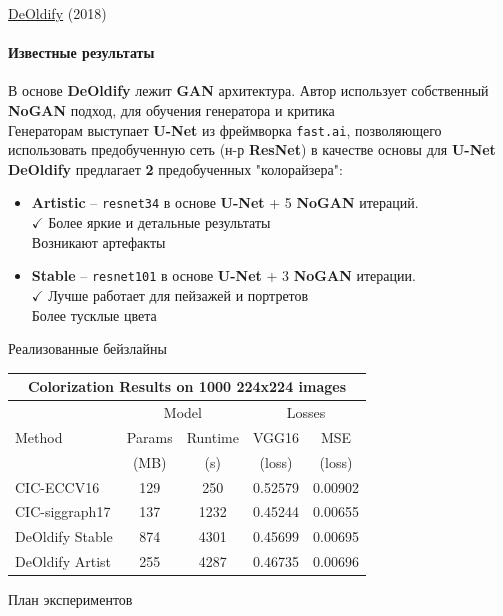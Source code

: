 \documentclass[aspectratio=169]{beamer}
\begin{document}
\begin{frame}{\href{https://github.com/jantic/DeOldify}{DeOldify} (2018)}
    \framesubtitle{Известные результаты}

    В основе \textbf{DeOldify} лежит \textbf{GAN} архитектура. Автор использует собственный \textbf{NoGAN} подход, для обучения генератора и критика\\[3mm]
    
    Генераторам выступает \textbf{U-Net} из фреймворка \texttt{fast.ai}, позволяющего использовать предобученную сеть (н-р \textbf{ResNet}) в качестве основы для \textbf{U-Net}\\[3mm]

    \textbf{DeOldify} предлагает \textbf{2} предобученных "колорайзера":\\[3mm]
    \begin{itemize}
        \item \textbf{Artistic} -- \texttt{resnet34} в основе \textbf{U-Net} + 5 \textbf{NoGAN} итераций. \\
        $\checkmark$ Более яркие и детальные результаты \\
         {} Возникают артефакты
        \item \textbf{Stable} -- \texttt{resnet101} в основе \textbf{U-Net} + 3 \textbf{NoGAN} итерации. \\ 
        $\checkmark$ Лучше работает для пейзажей и портретов \\
         {} Более тусклые цвета
    \end{itemize}
\end{frame}

\begin{frame}{Реализованные бейзлайны}

\begin{table}
    \begin{tabular}{l|c|c|c|c}
    \hline
    \multicolumn{5}{c}{Colorization Results on 1000 224x224 images}\\ 
    \hline
    \hline
    \multirow{3}{*}{Method} & \multicolumn{2}{c|}{Model} &  \multicolumn{2}{c}{Losses}\\
                            & Params & Runtime & VGG16 & MSE \\
                            & (MB) & (s) & (loss) & (loss) \\
    \hline
    CIC-ECCV16 & 129 & 250 & 0.52579 & 0.00902\\
    CIC-siggraph17 & 137 & 1232 & 0.45244 & 0.00655 \\
    \hline 
    DeOldify Stable & 874 & 4301 & 0.45699 & 0.00695\\
    DeOldify Artist & 255 & 4287 & 0.46735 & 0.00696\\


    

    \end{tabular}
\end{table}

\end{frame}

\begin{frame}{План экспериментов}
\end{frame}
\end{document}
